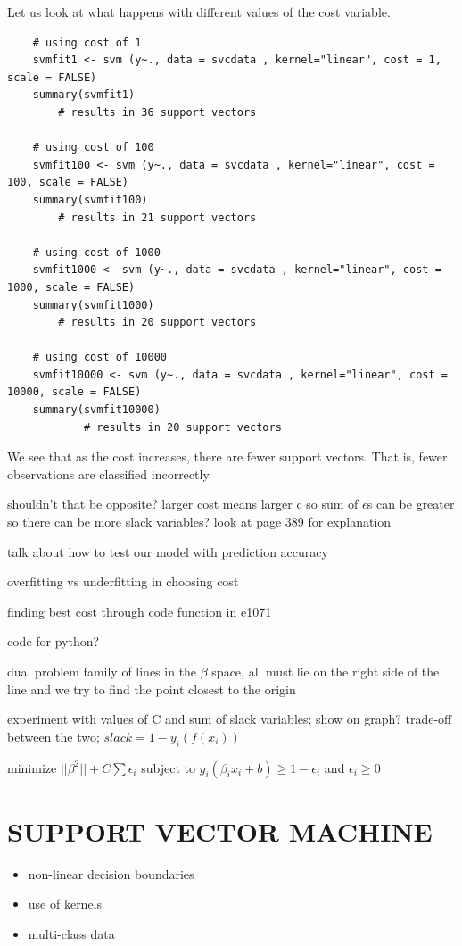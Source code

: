 \documentclass[12pt]{article}
\begin{document}
Let us look at what happens with different values of the cost variable.

\begin{verbatim}
    # using cost of 1
    svmfit1 <- svm (y~., data = svcdata , kernel="linear", cost = 1, scale = FALSE)
    summary(svmfit1)
        # results in 36 support vectors
    
    # using cost of 100
    svmfit100 <- svm (y~., data = svcdata , kernel="linear", cost = 100, scale = FALSE)
    summary(svmfit100)
        # results in 21 support vectors
        
    # using cost of 1000
    svmfit1000 <- svm (y~., data = svcdata , kernel="linear", cost = 1000, scale = FALSE)
    summary(svmfit1000)
        # results in 20 support vectors
    
    # using cost of 10000
    svmfit10000 <- svm (y~., data = svcdata , kernel="linear", cost = 10000, scale = FALSE)
    summary(svmfit10000)
            # results in 20 support vectors
\end{verbatim}

We see that as the cost increases, there are fewer support vectors. That is, fewer observations are classified incorrectly.

shouldn't that be opposite? larger cost means larger c so sum of $\epsilon$s can be greater so there can be more slack variables? look at page 389 for explanation

talk about how to test our model with prediction accuracy

overfitting vs underfitting in choosing cost

finding best cost through code function in e1071

code for python?

dual problem family of lines in the $\beta$ space, all must lie on the right side of the line and we try to find the point closest to the origin

experiment with values of C and sum of slack variables; show on graph? trade-off between the two; $slack = 1-y_i(f(x_i))$

minimize $||\beta^2|| + C \sum \epsilon_i$ subject to $y_i(\beta_ix_i+b) \ge 1- \epsilon_i$ and $\epsilon_i \ge 0$

\section{SUPPORT VECTOR MACHINE}
\begin{itemize}
    \item non-linear decision boundaries
    \item use of kernels
    \item multi-class data
\end{itemize}
\end{document}
